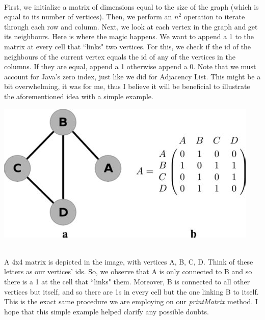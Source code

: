 \documentclass[letterpaper, 10pt]{article}
\begin{document}
\\
First, we initialize a matrix of dimensions equal to the size of the graph (which is equal to its number of vertices). Then, we perform an $n^2$ operation to iterate through each row and column. Next, we look at each vertex in the graph and get its neighbours. Here is where the magic happens. We want to append a 1 to the matrix at every cell that ``links" two vertices. For this, we check if the id of the neighbours of the current vertex equals the id of any of the vertices in the columns. If they are equal, append a 1 otherwise append a 0. Note that we must account for Java's zero index, just like we did for Adjacency List. This might be a bit overwhelming, it was for me, thus I believe it will be beneficial to illustrate the aforementioned idea with a simple example. 
\\
\begin{center}
    \includegraphics[scale=0.5]{images/adjMatrix.jpg}
\end{center}
\\
A 4x4 matrix is depicted in the image, with vertices A, B, C, D. Think of these letters as our vertices' ids. So, we observe that A is only connected to B and so there is a 1 at the cell that ``links" them. Moreover, B is connected to all other vertices but itself, and so there are 1s in every cell but the one linking B to itself. This is the exact same procedure we are employing on our \textit{printMatrix} method. I hope that this simple example helped clarify any possible doubts. 
\end{document}

